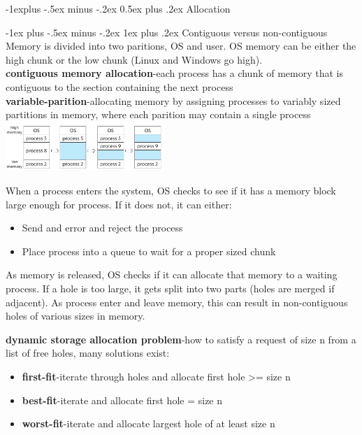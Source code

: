 \documentclass[8pt,landscape]{article}
\makeatletter
\renewcommand{\subsection}{\@startsection{subsection}{2}{0mm}%
                                {-1explus -.5ex minus -.2ex}%
                                {0.5ex plus .2ex}%
                                {\normalfont\scriptsize\bfseries}}
\renewcommand{\subsubsection}{\@startsection{subsubsection}{3}{0mm}%
                                {-1ex plus -.5ex minus -.2ex}%
                                {1ex plus .2ex}%
                                {\normalfont\tiny\bfseries}}
\makeatother
\begin{document}
\begin{multicols}{3}
\begin{tiny}
	\subsection{Allocation}
	
		\subsubsection{Contiguous versus non-contiguous}
		Memory is divided into two paritions, OS and user. OS memory can be either the high chunk
		or the low chunk (Linux and Windows go high).\\
		\textbf{contiguous memory allocation}-each process has a chunk of memory that is 
		contiguous to the section containing the next process\\
		
		\textbf{variable-parition}-allocating memory by assigning processes to variably sized 
		partitions in memory, where each parition may contain a single process\\
		\begingroup
			\centering
			\includegraphics[width=6cm]{varPart.png}
		\endgroup
		
		When a process enters the system, OS checks to see if it has a memory block large enough
		for process. If it does not, it can either:
		\begin{itemize}[noitemsep]
			\item Send and error and reject the process
			\item Place process into a queue to wait for a proper sized chunk
		\end{itemize}

		As memory is released, OS checks if it can allocate that memory to a waiting process.
		If a hole is too large, it gets split into two parts (holes are merged if adjacent).
		As process enter and leave memory, this can result in non-contiguous holes of various sizes
		in memory.

		\textbf{dynamic storage allocation problem}-how to satisfy a request of size n from a list
		of free holes, many solutions exist:
		
		\begin{itemize}[noitemsep]
			\item \textbf{first-fit}-iterate through holes and allocate first hole >= size n
			\item \textbf{best-fit}-iterate and allocate first hole = size n
			\item \textbf{worst-fit}-iterate and allocate largest hole of at least size n
		\end{itemize}


\end{tiny}
\end{multicols}
\end{document}
